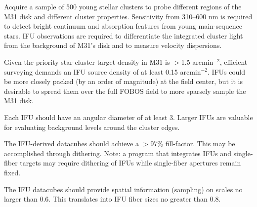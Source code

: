 \documentclass[11pt,a4paper,twoside,onecolumn,openany,final,oldfontcommands]{memoir}
\begin{document}
\begin{programrequirement}

\reqitem Acquire a sample of 500 young stellar clusters to probe different regions of the M31 disk and different cluster properties.
\reqitem Sensitivity from 310--600 nm is required to detect bright continuum and absorption features from young main-sequence stars.
\reqitem IFU observations are required to differentiate the integrated cluster light from the background of M31's disk and to measure velocity dispersions.
\end{programrequirement}

\medskip
\begin{sciencerequirement}
\reqitem Given the priority star-cluster target density in M31 is $>$1.5 arcmin$^{-2}$, efficient surveying demands an IFU source density of at least 0.15 arcmin$^{-2}$.  IFUs could be more closely packed (by an order of magnitude) at the field center, but it is desirable to spread them over the full FOBOS field to more sparsely sample the M31 disk.

\reqitem Each IFU should have an angular diameter of at least 3\arcsec{}.  Larger IFUs are valuable for evaluating background levels around the cluster edges.

\reqitem The IFU-derived datacubes should achieve a $>$97\% fill-factor.  This may be accomplished through dithering.  Note: a program that integrates IFUs and single-fiber targets may require dithering of IFUs while single-fiber apertures remain fixed.

\reqitem The IFU datacubes should provide spatial information (sampling) on scales no larger than 0.6\arcsec{}.  This translates into IFU fiber sizes no greater than 0.8\arcsec{}.

  

\end{sciencerequirement}

\end{document}
